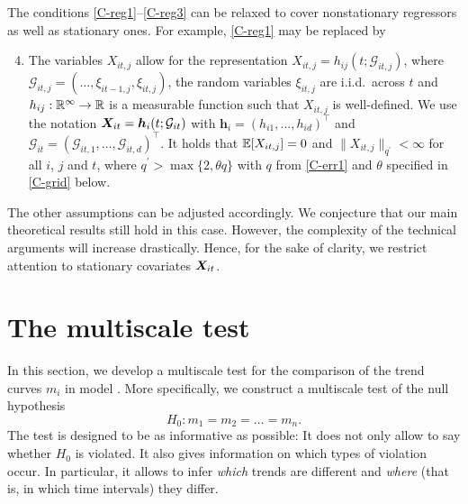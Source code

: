 \documentclass[a4paper,12pt]{article}
\makeatletter
\renewcommand{\eqref}[1]{\tagform@{\ref{#1}}}
\makeatother
\begin{document}
\begin{remark}
The conditions \ref{C-reg1}--\ref{C-reg3} can be relaxed to cover nonstationary regressors as well as stationary ones. For example, \ref{C-reg1} may be replaced by
\begin{enumerate}[label=(C\arabic*$^\prime$),leftmargin=1.1cm]
\setcounter{enumi}{3}
\item \label{C-reg1-star} The variables $X_{it, j}$ allow for the representation $X_{it, j} = h_{ij}(t; \mathcal{G}_{it, j})$, where $\mathcal{G}_{it, j} = (\ldots, \xi_{it-1,j}, \xi_{it, j})$, the random variables $\xi_{it, j}$ are i.i.d.\ across $t$ and $h_{ij}: \mathbb{R}^\infty \rightarrow \mathbb{R}$ is a measurable function such that $X_{it, j}$ is well-defined. We use the notation $\boldsymbol{X}_{it} = \boldsymbol{h}_{i}(t; \mathcal{G}_{it})$ with $\boldsymbol{h}_i = (h_{i1}, \ldots, h_{id})^\top$ and $\mathcal{G}_{it} = (\mathcal{G}_{it,1}, \ldots, \mathcal{G}_{it, d})^\top$. It holds that $\mathbb{E} [X_{it, j}]=0$ and $\| X_{it, j} \|_{q^\prime} <\infty$ for all $i$, $j$ and $t$, where $q^\prime > \max \{ 2, \theta q \}$ with $q$ from \ref{C-err1} and $\theta$ specified in \ref{C-grid} below.
\end{enumerate}
The other assumptions can be adjusted accordingly. We conjecture that our main theoretical results still hold in this case. However, the complexity of the technical arguments will increase drastically. Hence, for the sake of clarity, we restrict attention to stationary covariates $\boldsymbol{X}_{it}$. 
\end{remark}



\section{The multiscale test}\label{sec:test}


In this section, we develop a multiscale test for the comparison of the trend curves $m_i$ in model \eqref{eq:model_full}. More specifically, we construct a multiscale test of the null hypothesis 
\[ H_0: m_1 = m_2 = \ldots = m_n. \]
The test is designed to be as informative as possible: It does not only allow to say whether $H_0$ is violated. It also gives information on which types of violation occur. In particular, it allows to infer \textit{which} trends are different and \textit{where} (that is, in which time intervals) they differ. 
\end{document}
